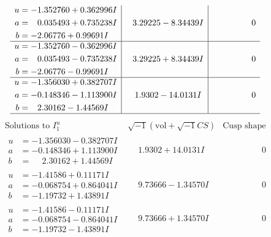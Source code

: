 \documentclass[1p]{elsarticle_modified}
\theoremstyle{definition}
\newcommand{\I}{\sqrt{-1}}
\begin{document}
$$\begin{array}{c|c|c}
\begin{aligned}
u &= -1.352760 + 0.362996 I \\
a &= \phantom{-}0.035493 + 0.735238 I \\
b &= -2.06776 + 0.99691 I\end{aligned}
 & \phantom{-}3.29225 - 8.34439 I & \phantom{-0.000000 } 0 \\ \hline\begin{aligned}
u &= -1.352760 - 0.362996 I \\
a &= \phantom{-}0.035493 - 0.735238 I \\
b &= -2.06776 - 0.99691 I\end{aligned}
 & \phantom{-}3.29225 + 8.34439 I & \phantom{-0.000000 } 0 \\ \hline\begin{aligned}
u &= -1.356030 + 0.382707 I \\
a &= -0.148346 - 1.113900 I \\
b &= \phantom{-}2.30162 - 1.44569 I\end{aligned}
 & \phantom{-}1.9302 - 14.0131 I & \phantom{-0.000000 } 0\\
 \hline 
 \end{array}$$\newpage$$\begin{array}{c|c|c}  
\text{Solutions to }I^u_{1}& \I (\text{vol} + \sqrt{-1}CS) & \text{Cusp shape}\\
 \hline 
\begin{aligned}
u &= -1.356030 - 0.382707 I \\
a &= -0.148346 + 1.113900 I \\
b &= \phantom{-}2.30162 + 1.44569 I\end{aligned}
 & \phantom{-}1.9302 + 14.0131 I & \phantom{-0.000000 } 0 \\ \hline\begin{aligned}
u &= -1.41586 + 0.11171 I \\
a &= -0.068754 + 0.864041 I \\
b &= -1.19732 + 1.43891 I\end{aligned}
 & \phantom{-}9.73666 - 1.34570 I & \phantom{-0.000000 } 0 \\ \hline\begin{aligned}
u &= -1.41586 - 0.11171 I \\
a &= -0.068754 - 0.864041 I \\
b &= -1.19732 - 1.43891 I\end{aligned}
 & \phantom{-}9.73666 + 1.34570 I & \phantom{-0.000000 } 0 \\ \hline\begin{aligned}

\end{aligned}
\end{array}$$
\end{document}
